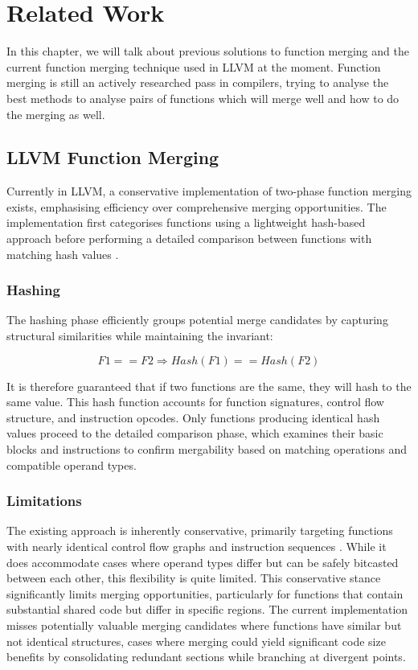 \section{Related Work}
In this chapter, we will talk about previous solutions to function merging and the current function merging technique used in LLVM at the moment. Function merging is still an actively researched pass in compilers, trying to analyse the best methods to analyse pairs of functions which will merge well and how to do the merging as well.

\subsection{LLVM Function Merging}
Currently in LLVM, a conservative implementation of two-phase function merging exists, emphasising efficiency over comprehensive merging opportunities. The implementation first categorises functions using a lightweight hash-based approach before performing a detailed comparison between functions with matching hash values \cite{LLVMFuncMergSrc}.

\subsubsection{Hashing}
The hashing phase efficiently groups potential merge candidates by capturing structural similarities while maintaining the invariant:

\begin{equation}
F1 == F2 \Rightarrow Hash(F1) == Hash(F2)
\end{equation}

It is therefore guaranteed that if two functions are the same, they will hash to the same value. This hash function accounts for function signatures, control flow structure, and instruction opcodes. Only functions producing identical hash values proceed to the detailed comparison phase, which examines their basic blocks and instructions to confirm mergability based on matching operations and compatible operand types.

\subsubsection{Limitations}
The existing approach is inherently conservative, primarily targeting functions with nearly identical control flow graphs and instruction sequences \cite{LLVMMergeFunctionsPass}. While it does accommodate cases where operand types differ but can be safely bitcasted between each other, this flexibility is quite limited. This conservative stance significantly limits merging opportunities, particularly for functions that contain substantial shared code but differ in specific regions. The current implementation misses potentially valuable merging candidates where functions have similar but not identical structures, cases where merging could yield significant code size benefits by consolidating redundant sections while branching at divergent points.

